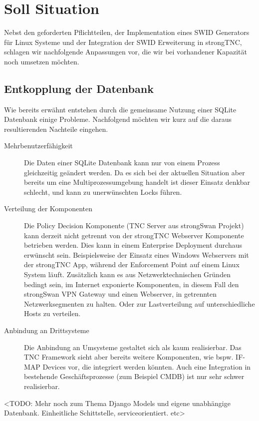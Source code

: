 \section{Soll Situation}
Nebst den geforderten Pflichtteilen, der Implementation eines SWID Generators
für Linux Systeme und der Integration der SWID Erweiterung in strongTNC,
schlagen wir nachfolgende Anpassungen vor, die wir bei vorhandener Kapazität
noch umsetzen möchten.

\subsection{Entkopplung der Datenbank}
Wie bereits erwähnt entstehen durch die gemeinsame Nutzung einer SQLite
Datenbank einige Probleme. Nachfolgend möchten wir kurz auf die daraus
resultierenden Nachteile eingehen.

\begin{description}
	\item[Mehrbenutzerfähigkeit] Die Daten einer SQLite Datenbank kann nur von
	einem Prozess gleichzeitig geändert werden. Da es sich bei der aktuellen
	Situation aber bereits um eine Multiprozessumgebung handelt ist dieser Einsatz
	denkbar schlecht, und kann zu unerwünschten Locks führen.

	\item[Verteilung der Komponenten] Die Policy Decision Komponente (TNC Server
	aus strongSwan Projekt) kann derzeit nicht getrennt von der strongTNC Webserver
	Komponente betrieben werden. Dies kann in einem Enterprise Deployment
	durchaus erwünscht sein. Beispielsweise der Einsatz eines Windows Webservers
	mit der strongTNC App, während der Enforcement Point auf einem Linux System
	läuft. Zusätzlich kann es aus Netzwerktechnischen Gründen bedingt sein, im
	Internet exponierte Komponenten, in diesem Fall den strongSwan VPN Gateway und
	einen Webserver, in getrennten Netzwerksegmenten zu halten. Oder zur
	Lastverteilung auf unterschiedliche Hosts zu verteilen.

	\item[Anbindung an Drittsysteme] Die Anbindung an Umsysteme gestaltet sich als
	kaum realisierbar. Das TNC Framework sieht aber bereits weitere Komponenten,
	wie bspw. IF-MAP Devices vor, die integriert werden könnten. Auch eine
	Integration in bestehende Geschäftsprozesse (zum Beispiel CMDB) ist nur sehr
	schwer realisierbar.
\end{description} 

<TODO: Mehr noch zum Thema Django Models und eigene unabhängige Datenbank.
Einheitliche Schittstelle, serviceorientiert. etc>

